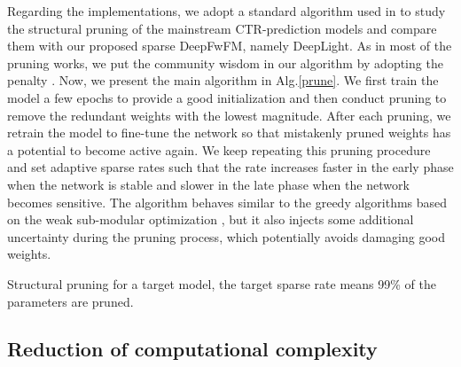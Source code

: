 \documentclass[sigconf]{acmart}
\begin{document}
Regarding the implementations, we adopt a standard algorithm used in \citep{deng2019, frankle2018lottery} to study the structural pruning of the mainstream CTR-prediction models and compare them with our proposed sparse DeepFwFM, namely DeepLight. As in most of the pruning works, we put the community wisdom in our algorithm by adopting the  penalty \citep{han2015learning, hansong16}. Now, we present the main algorithm in Alg.\ref{prune}. We first train the model a few epochs to provide a good initialization and then conduct pruning to remove the redundant weights with the lowest magnitude. After each pruning, we retrain the model to fine-tune the network so that mistakenly pruned weights has a potential to become active again. We keep repeating this pruning procedure and set adaptive sparse rates such that the rate increases faster in the early phase when the network is stable and slower in the late phase when the network becomes sensitive. The algorithm behaves similar to the greedy algorithms based on the weak sub-modular optimization \cite{Abhimanyu11}, but it also injects some additional uncertainty during the pruning process, which potentially avoids damaging good weights. 


\begin{algorithm}
\caption{Structural pruning for a target model, the target sparse rate  means 99\% of the parameters are pruned.}\label{prune}
\begin{algorithmic}[1]




\end{algorithmic}
\end{algorithm}







\subsection{Reduction of computational complexity} 
\end{document}

